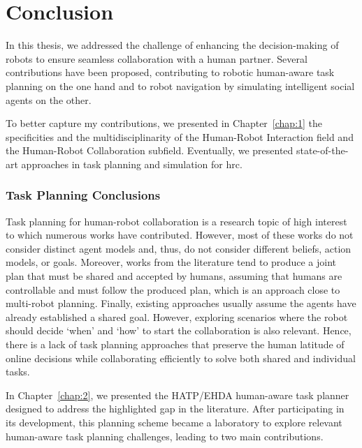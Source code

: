 \newpage
\thispagestyle{empty}
\mbox{}


\chapter*{Conclusion}


In this thesis, we addressed the challenge of enhancing the decision-making of robots to ensure seamless collaboration with a human partner. Several contributions have been proposed, contributing to robotic human-aware task planning on the one hand and to robot navigation by simulating intelligent social agents on the other. 

To better capture my contributions, we presented in Chapter~\ref{chap:1} the specificities and the multidisciplinarity of the Human-Robot Interaction field and the Human-Robot Collaboration subfield. Eventually, we presented state-of-the-art approaches in task planning and simulation for \acrshort{hrc}. 

\subsection*{Task Planning Conclusions}

Task planning for human-robot collaboration is a research topic of high interest to which numerous works have contributed. However, most of these works do not consider distinct agent models and, thus, do not consider different beliefs, action models, or goals. Moreover, works from the literature tend to produce a joint plan that must be shared and accepted by humans, assuming that humans are controllable and must follow the produced plan, which is an approach close to multi-robot planning. Finally, existing approaches usually assume the agents have already established a shared goal. However, exploring scenarios where the robot should decide `when' and `how' to start the collaboration is also relevant. 
Hence, there is a lack of task planning approaches that preserve the human latitude of online decisions while collaborating efficiently to solve both shared and individual tasks. 


In Chapter~\ref{chap:2}, we presented the HATP/EHDA human-aware task planner designed to address the highlighted gap in the literature. After participating in its development, this planning scheme became a laboratory to explore relevant human-aware task planning challenges, leading to two main contributions. 

